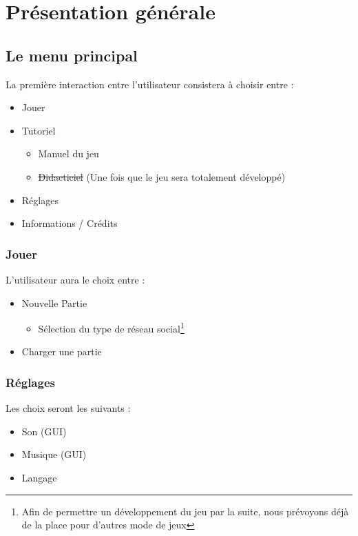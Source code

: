 \chapter{Présentation générale}
\label{chap:presentationgenerale}

\section{Le menu principal}

La première interaction entre l'utilisateur consistera à choisir entre :

\begin{itemize}
    \item Jouer
    \item Tutoriel
    \begin{itemize}
    \item Manuel du jeu
    \item \sout{Didacticiel} (Une fois que le jeu sera totalement développé)
\end{itemize}
    \item Réglages
    \item Informations / Crédits
\end{itemize}

\subsection{Jouer}
L'utilisateur aura le choix entre :
\begin{itemize}
    \item Nouvelle Partie
    \begin{itemize}
    \item Sélection du type de réseau social\footnote{Afin de permettre un développement du jeu par la suite, nous prévoyons déjà de la place pour d'autres mode de jeux}
\end{itemize}

    \item Charger une partie
\end{itemize}

\clearpage
\subsection{Réglages}
Les choix seront les suivants :
\begin{itemize}
    \item Son (GUI)
    \item Musique (GUI)
    \item Langage
\end{itemize}

